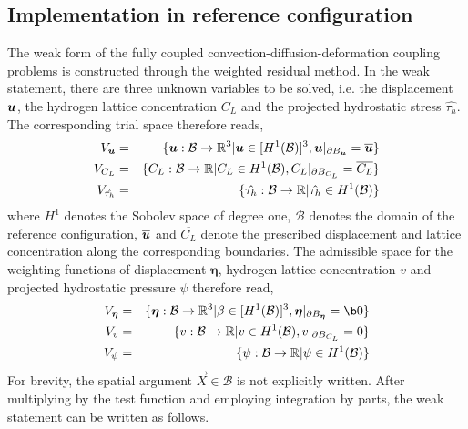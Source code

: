 \documentclass[10pt]{elsarticle}
\newcommand{\mbs}[1]{\boldsymbol{#1}}
\def\beeta{{\mbs{\eta}}}
\begin{document}
\subsection{Implementation in reference configuration}
The weak form of the fully coupled convection-diffusion-deformation coupling problems is constructed
through the weighted residual method. In the weak statement, there are three unknown variables to be solved, i.e. 
the displacement $\bu$, the hydrogen lattice concentration $C_{L}$  and the projected hydrostatic stress $\hat{\tau_{h}}$. 
The corresponding trial space therefore reads, 
\begin{eqnarray}
    \label{eq:trialSpace}
      V_{\bu} &=& \{ \bu : \mathcal{B} \rightarrow \mathbb{R}^{3} | \bu \in [H^{1}(\mathcal{B})]^{3} , \label{eq:uspace} \bu|_{\partial B_{\bu}} = \overline{\bu} \} \nonumber \\
       V_{C_{L}} &=& \{ C_{L} : \mathcal{B} \rightarrow \mathbb{R} | C_{L} \in H^{1}(\mathcal{B}), C_{L}|_{\partial B_{C_{L}}} = \overline{C_{L}} \} \\
      V_{\hat{\tau_{h}}} &=& \{  \hat{\tau_{h}} : \mathcal{B} \rightarrow \mathbb{R} | \hat{\tau_{h}} \in H^{1}(\mathcal{B}) \} \nonumber 
    \end{eqnarray}
    where $H^{1}$ denotes the Sobolev space of degree one, $\mathcal{B}$ denotes the 
    domain of the reference configuration, $\overline{\bu}$ and $\overline{C_{L}}$
    denote the prescribed displacement and lattice concentration along the
    corresponding boundaries. The
    admissible space for the weighting functions of displacement $\beeta$, hydrogen lattice concentration $v$ and projected hydrostatic pressure $\psi$ therefore read,
    \begin{eqnarray}
    \label{eq:variation}
      V_{\beeta} &=& \{  \beeta : \mathcal{B} \rightarrow \mathbb{R}^{3} | \beta \in [H^{1}(\mathcal{B})]^{3} ,  \beeta|_{\partial B_{\beeta}} = \b0 \} \nonumber \\
      V_{v} &=& \{ v : \mathcal{B} \rightarrow \mathbb{R} | v \in H^{1}(\mathcal{B}), v|_{\partial B_{C_{L}}} =0 \}  \\
      V_{\psi} &=& \{ \psi : \mathcal{B} \rightarrow \mathbb{R} | \psi \in H^{1}(\mathcal{B}) \}
      \nonumber 
      \label{eq:varp}
    \end{eqnarray}
    For brevity, the spatial argument $\vec{X} \in \mathcal{B}$ is not
    explicitly written. After multiplying by the test function and employing integration by parts, the weak statement can be written as follows. 
    
\end{document}
